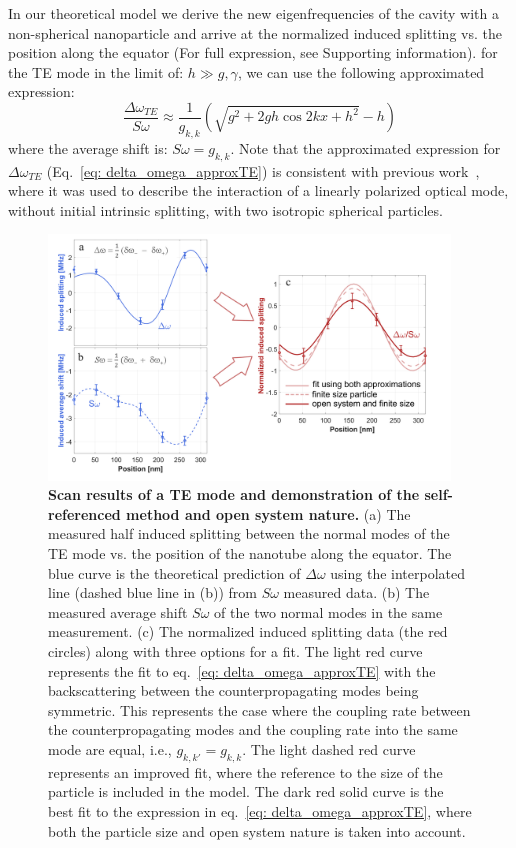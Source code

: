 \documentclass[journal=jacsat,manuscript=article]{achemso}
\begin{document}
In our theoretical model we derive the new eigenfrequencies of the cavity with a non-spherical nanoparticle and arrive at the normalized induced splitting vs. the position along the equator (For full expression, see Supporting information). for the TE mode in the limit of: $h\gg g, \gamma$, we can use the following approximated expression:
\begin{equation}
\frac{\Delta \omega_{TE}}{S\omega}  \approx \frac{1}{g_{k,k}}(\sqrt{ g^2 + 2  g h \cos{2 k x}  + h^2}-h)
\label{eq: delta_omega_approxTE}
\end{equation}
where the average shift is: $\textit{S}\omega=g_{k,k}$.
Note that the approximated expression for $\Delta \omega_{TE} $ (Eq.~\ref{eq: delta_omega_approxTE}) is consistent with previous work~\cite{he2013statistics}, where it was used to describe the interaction of a linearly polarized optical mode, without initial intrinsic splitting, with two isotropic spherical particles.

\begin{figure}[H]
\centering
   \includegraphics[width=0.95\textwidth]{Images/data_plot_19_TE_forPaper_subplot1C.png}
        \caption{\textbf{Scan results of a TE mode and demonstration of the self-referenced method and open system nature.} (a) The measured half induced splitting between the normal modes of the TE mode vs. the position of the nanotube along the equator. The blue curve is the theoretical prediction of $\Delta \omega$ using the interpolated line (dashed blue line in (b)) from $\textit{S}\omega$ measured data. (b) The measured average shift $\textit{S}\omega$ of the two normal modes in the same measurement. (c) The normalized induced splitting data (the red circles) along with three options for a fit. The light red curve represents the fit to eq.~\ref{eq: delta_omega_approxTE} with the backscattering between the counterpropagating modes being symmetric. This represents the case where the coupling rate between the counterpropagating modes and the coupling rate into the same mode are equal, i.e., $g_{k,k'} = g_{k,k}$. The light dashed red curve represents an improved fit, where the reference to the size of the particle is included in the model. The dark red solid curve is the best fit to the expression in eq.~\ref{eq: delta_omega_approxTE}, where both the particle size and open system nature is taken into account.}
\label{fig:TE_set19_splitting}
\end{figure}
\end{document}
